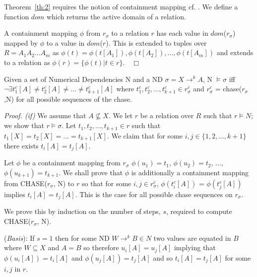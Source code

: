 Theorem~\ref{th:2} requires the notion of containment mapping
cf. \cite{atze93}.  We define a function $dom$ which
returns the active domain of a relation.

\begin{definition}\label{def:cm}
\begin{rm}
A containment mapping $\phi$ from $r_\sigma$ to a relation $r$ has
each value in $dom$($r_\sigma$) mapped by $\phi$ to a value in $dom$($r$).
This is extended to tuples over $R = A_1A_2 \ldots A_m$ as $\phi(t) =
\phi(t[A_1]),\phi(t[A_2]),\ldots, \phi(t[A_m])$ and extends to a
relation as $\phi(r) = \{ \phi(t) | t \in r \}$.$\quad\Box$ 
\end{rm}
\end{definition}


\begin{theorem}\label{th:2}
\begin{rm}
Given a set of Numerical Dependencies N and a ND $\sigma = X \to^k A$,
N $\models \sigma$ iff $\neg\exists t^c_1[A] \not= t^c_2[A] \not= \ldots
\not= t^c_{k+1}[A]$ where $t^c_1,t^c_2,\ldots,t^c_{k+1} \in
r_\sigma^c$ and $r_\sigma^c$ = chase($r_\sigma$,N) for all possible
sequences of the chase.
\end{rm}
\end{theorem}


{\em Proof. (if)} We assume that $A \not\subseteq X$. We let $r$ be a
relation over $R$ such that $r \models N$; we show that $r \models
\sigma$. Let $t_1, t_2, \ldots, t_{k+1} \in r$ such that $t_1[X] =
t_2[X] = \ldots = t_{k+1}[X]$. We claim that for some $i,
j \in \{1, 2, \ldots, {k+1}\}$ there exists $t_i[A] = t_j[A]$. 

\smallskip
Let $\phi$ be a containment mapping from $r_\sigma$
$\phi(u_1) = t_1$, $\phi(u_2) = t_2$, $\ldots$, $\phi(u_{k+1}) = t_{k+1}$. We
shall prove that $\phi$ is additionally a containment mapping from
CHASE($r_{\sigma}$, N) to $r$ so that for some $i,j \in r_{\sigma}^c$,
$\phi(t_i^c[A])$ = $\phi(t_j^c[A])$ implies $t_i[A] = t_j[A]$. This is
the case for all possible chase sequences on $r_\sigma$. 

\smallskip
We prove this by induction on the number of steps, $s$, required to compute
CHASE($r_{\sigma}$, N).

\smallskip

({\em Basis}):
If $s = 1$ then for some ND $W \to^k B \in N$ two values are equated 
in $B$ where \linebreak $W \subseteq X$ and $A = B$ so therefore $u_i[A] =
u_j[A]$ implying that $\phi(u_i[A]) = t_i[A]$ and \linebreak $\phi(u_j[A]) =
t_j[A]$ and so $t_i[A] = t_j[A]$ for some $i,j$ in $r$.
\smallskip
 
